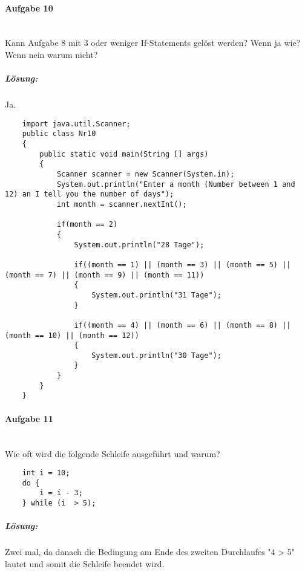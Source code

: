 \documentclass[12pt,a4paper,ngerman]{scrartcl}
\begin{document}
	\newpage
	
	\paragraph{Aufgabe 10}\mbox{}\\
	Kann Aufgabe 8 mit 3 oder weniger If-Statements gelöst werden? Wenn ja wie? Wenn nein warum nicht?
	
	\subparagraph{Lösung:} 
	Ja.
	\begin{lstlisting}
	import java.util.Scanner;
	public class Nr10
	{
		public static void main(String [] args)
		{
			Scanner scanner = new Scanner(System.in);
			System.out.println("Enter a month (Number between 1 and 12) an I tell you the number of days");
			int month = scanner.nextInt();
			
			if(month == 2)
			{
				System.out.println("28 Tage");
				
				if((month == 1) || (month == 3) || (month == 5) || (month == 7) || (month == 9) || (month == 11))
				{
					System.out.println("31 Tage");
				}
				
				if((month == 4) || (month == 6) || (month == 8) || (month == 10) || (month == 12))
				{
					System.out.println("30 Tage");
				}
			}
		}
	}
	\end{lstlisting}
	
	\newpage
	
	\paragraph{Aufgabe 11}\mbox{}\\
	Wie oft wird die folgende Schleife ausgeführt und warum?
	\begin{lstlisting}
	int i = 10;
	do { 
		i = i - 3;
	} while (i  > 5);
	\end{lstlisting}
	
	\subparagraph{Lösung:}
	Zwei mal, da danach die Bedingung am Ende des zweiten Durchlaufes "4 > 5" lautet und somit die Schleife beendet wird. 
	
	
\end{document}
